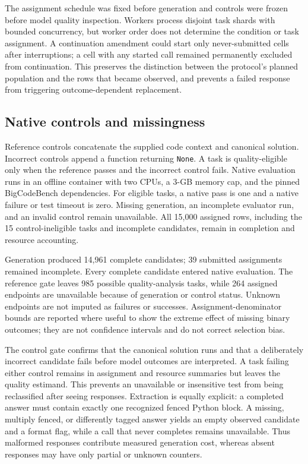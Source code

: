 The assignment schedule was fixed before generation and controls were frozen before model quality inspection. Workers process disjoint task shards with bounded concurrency, but worker order does not determine the condition or task assignment. A continuation amendment could start only never-submitted cells after interruptions; a cell with any started call remained permanently excluded from continuation. This preserves the distinction between the protocol's planned population and the rows that became observed, and prevents a failed response from triggering outcome-dependent replacement.

\subsection{Native controls and missingness}
Reference controls concatenate the supplied code context and canonical solution. Incorrect controls append a function returning \texttt{None}. A task is quality-eligible only when the reference passes and the incorrect control fails. Native evaluation runs in an offline container with two CPUs, a 3-GB memory cap, and the pinned BigCodeBench dependencies. For eligible tasks, a native pass is one and a native failure or test timeout is zero. Missing generation, an incomplete evaluator run, and an invalid control remain unavailable. All 15,000 assigned rows, including the 15 control-ineligible tasks and incomplete candidates, remain in completion and resource accounting.

Generation produced 14,961 complete candidates; 39 submitted assignments remained incomplete. Every complete candidate entered native evaluation. The reference gate leaves 985 possible quality-analysis tasks, while 264 assigned endpoints are unavailable because of generation or control status. Unknown endpoints are not imputed as failures or successes. Assignment-denominator bounds are reported where useful to show the extreme effect of missing binary outcomes; they are not confidence intervals and do not correct selection bias.

The control gate confirms that the canonical solution runs and that a deliberately incorrect candidate fails before model outcomes are interpreted. A task failing either control remains in assignment and resource summaries but leaves the quality estimand. This prevents an unavailable or insensitive test from being reclassified after seeing responses. Extraction is equally explicit: a completed answer must contain exactly one recognized fenced Python block. A missing, multiply fenced, or differently tagged answer yields an empty observed candidate and a format flag, while a call that never completes remains unavailable. Thus malformed responses contribute measured generation cost, whereas absent responses may have only partial or unknown counters.

